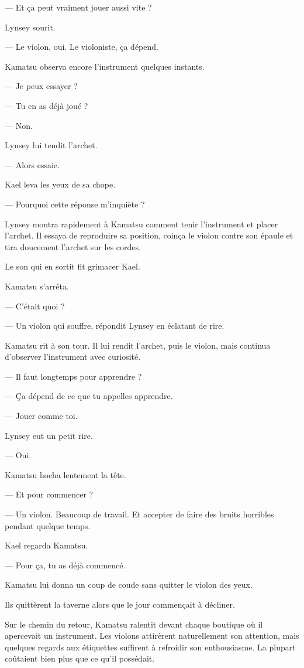 — Et ça peut vraiment jouer aussi vite ?

Lynsey sourit.

— Le violon, oui. Le violoniste, ça dépend.

Kamatsu observa encore l'instrument quelques instants.

— Je peux essayer ?

— Tu en as déjà joué ?

— Non.

Lynsey lui tendit l'archet.

— Alors essaie.

Kael leva les yeux de sa chope.

— Pourquoi cette réponse m'inquiète ?

Lynsey montra rapidement à Kamatsu comment tenir l'instrument et placer
l'archet. Il essaya de reproduire sa position, coinça le violon contre son
épaule et tira doucement l'archet sur les cordes.

Le son qui en sortit fit grimacer Kael.

Kamatsu s'arrêta.

— C'était quoi ?

— Un violon qui souffre, répondit Lynsey en éclatant de rire.

Kamatsu rit à son tour. Il lui rendit l'archet, puis le violon, mais continua
d'observer l'instrument avec curiosité.

— Il faut longtemps pour apprendre ?

— Ça dépend de ce que tu appelles apprendre.

— Jouer comme toi.

Lynsey eut un petit rire.

— Oui.

Kamatsu hocha lentement la tête.

— Et pour commencer ?

— Un violon. Beaucoup de travail. Et accepter de faire des bruits horribles
pendant quelque temps.

Kael regarda Kamatsu.

— Pour ça, tu as déjà commencé.

Kamatsu lui donna un coup de coude sans quitter le violon des yeux.

\scenebreak

Ils quittèrent la taverne alors que le jour commençait à décliner.

Sur le chemin du retour, Kamatsu ralentit devant chaque boutique où il
apercevait un instrument. Les violons attirèrent naturellement son attention,
mais quelques regards aux étiquettes suffirent à refroidir son enthousiasme.
La plupart coûtaient bien plus que ce qu'il possédait.

